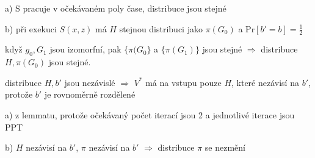 \documentclass[a4paper,12pt,titlepage]{article}
\begin{document}
a) S pracuje v očekávaném poly čase, distribuce jsou stejné

b) při exekuci $S(x,z)$ má $H$ stejnou distribuci jako $\pi(G_0)$ a Pr$[b'=b]=\frac{1}{2}$

když $g_0, G_1$ jsou izomorfní, pak $\{\pi(G_0\}$ a $\{\pi(G_1)\}$ jsou stejné $\Rightarrow$ distribuce $H,\pi(G_0)$ jsou stejné.

distribuce $H,b'$ jsou nezávislé $\Rightarrow$ $V^*$ má na vstupu pouze $H$, které nezávisí na $b'$, protože $b'$ je rovnoměrně rozdělené

a) z lemmatu, protože očekávaný počet iterací jsou 2 a jednotlivé iterace jsou PPT

b) $H$ nezávisí na $b'$, $\pi$ nezávisí na $b'$ $\Rightarrow$ distribuce $\pi$ se nezmění
\end{document}
